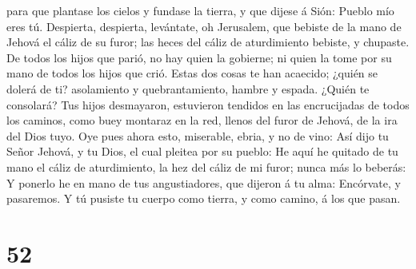 para que plantase los cielos y fundase la tierra, y que dijese á Sión:
Pueblo mío eres tú.  Despierta, despierta, levántate, oh
Jerusalem, que bebiste de la mano de Jehová el cáliz de su furor; las
heces del cáliz de aturdimiento bebiste, y chupaste.  De
todos los hijos que parió, no hay quien la gobierne; ni quien la tome
por su mano de todos los hijos que crió.  Estas dos cosas
te han acaecido; ¿quién se dolerá de ti? asolamiento y quebrantamiento,
hambre y espada. ¿Quién te consolará?  Tus hijos
desmayaron, estuvieron tendidos en las encrucijadas de todos los
caminos, como buey montaraz en la red, llenos del furor de Jehová, de la
ira del Dios tuyo.  Oye pues ahora esto, miserable,
ebria, y no de vino:  Así dijo tu Señor Jehová, y tu
Dios, el cual pleitea por su pueblo: He aquí he quitado de tu mano el
cáliz de aturdimiento, la hez del cáliz de mi furor; nunca más lo
beberás:  Y ponerlo he en mano de tus angustiadores, que
dijeron á tu alma: Encórvate, y pasaremos. Y tú pusiste tu cuerpo como
tierra, y como camino, á los que pasan.

\hypertarget{section-51}{%
\section{52}\label{section-51}}


